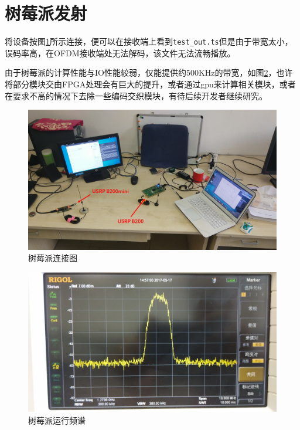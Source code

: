 	\section{树莓派发射}
		\par 将设备按图\ref{fig:dvbt_raspi}所示连接，便可以在接收端上看到\lstinline[language=sh]{test_out.ts}但是由于带宽太小，误码率高，在OFDM接收端处无法解码，该文件无法流畅播放。
		\par 由于树莓派的计算性能与IO性能较弱，仅能提供约500KHz的带宽，如图\ref{fig:dvbt_raspi_bandwidth}，也许将部分模块交由FPGA处理会有巨大的提升，或者通过gpu来计算相关模块，或者在要求不高的情况下去除一些编码交织模块，有待后续开发者继续研究。
		\begin{figure}[htp]
			\centering
			\includegraphics[width=13cm]{figures/dvbt_raspi.png}
			\caption{树莓派连接图}
			\label{fig:dvbt_raspi}
		\end{figure}
		\begin{figure}[htp]
			\centering
			\includegraphics[width=13cm]{figures/dvbt_raspi_bandwidth.jpg}
			\caption{树莓派运行频谱}
			\label{fig:dvbt_raspi_bandwidth}
		\end{figure}
